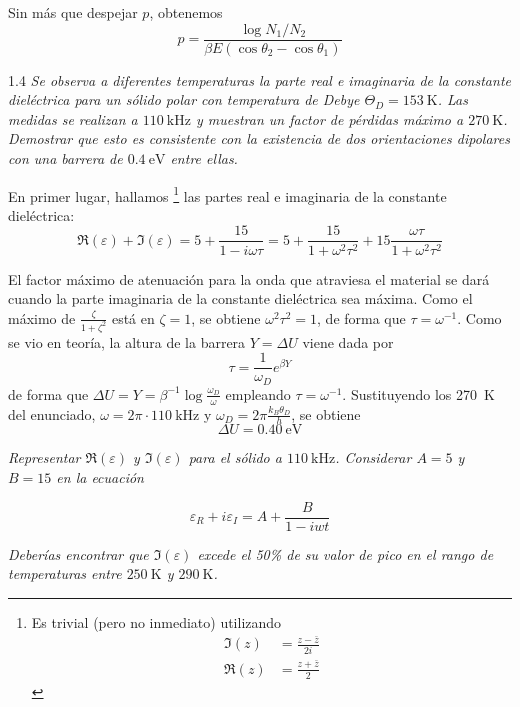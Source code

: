 \documentclass{tufte-book}
\newcommand{\sub}[1]{_{{\scriptscriptstyle\mathit{#1}}}}
\newcommand{\kb}{k\sub{B}}
\begin{document}
Sin más que despejar $p$, obtenemos
\begin{equation}
  p = \frac{\log N_1/N_2}{βE(\cos θ_2 - \cos θ_1)}
\end{equation}

\begin{tcolorbox}[halign=left]
  \lettrine[lines=2]{\color{ExerciseNumberColor}1.4}{}
  \emph{
    Se observa a diferentes temperaturas la parte real e imaginaria de la constante dieléctrica
    para un sólido polar con temperatura de Debye
    $Θ\sub{D}=\SI{153}{\kelvin}$. Las medidas se realizan a
    $\SI{110}{\kilo\hertz}$ y muestran un factor de pérdidas máximo a
    $\SI{270}{\kelvin}$. Demostrar que esto es consistente con la
    existencia de dos orientaciones dipolares con una barrera de
    $\SI{0.4}{\eV}$ entre ellas.
  }
\end{tcolorbox}


En primer lugar, hallamos
\footnote{
 Es trivial (pero no inmediato) utilizando
  \begin{align*}
    \Im(z) &= \frac{z - \bar{z}}{2i} \\
    \Re(z) &= \frac{z + \bar{z}}{2}
  \end{align*}
}
las partes real e imaginaria de la constante dieléctrica:
\begin{equation}
  \Re(ε) + \Im(ε) = 5 + \frac{15}{1-iωτ} = 5+ \frac{15}{1+ω^2τ^2} + 15 \frac{ωτ}{1+ω^2τ^2}
\end{equation}

El factor máximo de atenuación para la onda que atraviesa el material
se dará cuando la parte imaginaria de la constante dieléctrica sea
máxima. Como el máximo de $\frac{ζ}{1+ζ^2}$ está en $ζ=1$, se obtiene
$ω^2τ^2 = 1$, de forma que $τ=ω^{-1}$. Como se vio en teoría, la
altura de la barrera $Y=ΔU$ viene dada por
\begin{equation}
  τ = \frac{1}{ω\sub{D}} e^{βY}
\end{equation}
de forma que $ΔU = Y = β^{-1} \log \frac{ω\sub{D}}{ω}$ empleando
$τ=ω^{-1}$. Sustituyendo los \SI{270}{\kelvin} del enunciado,
$ω=2π\cdot \SI{110}{\kilo\hertz}$ y $ω\sub{D} = 2π \frac{\kb
  θ\sub{D}}{h}$, se obtiene
\begin{equation}
  ΔU = \SI{0.40}{\eV}
\end{equation}

\begin{tcolorbox}[halign=left]
  \emph{
    Representar $\Re(ε)$ y $\Im(ε)$ para el sólido a
    $\SI{110}{\kilo\hertz}$. Considerar $A=5$ y $B=15$ en la ecuación
    }

    \begin{equation*}
      ε_R + i ε_I = A + \frac{B}{1- i wt}
    \end{equation*}

    \emph{
      Deberías encontrar que $\Im(ε)$ excede el 50\% de su valor de pico
      en el rango de temperaturas entre $\SI{250}{\kelvin}$ y $\SI{290}{\kelvin}$.
    }
\end{tcolorbox}
\end{document}
